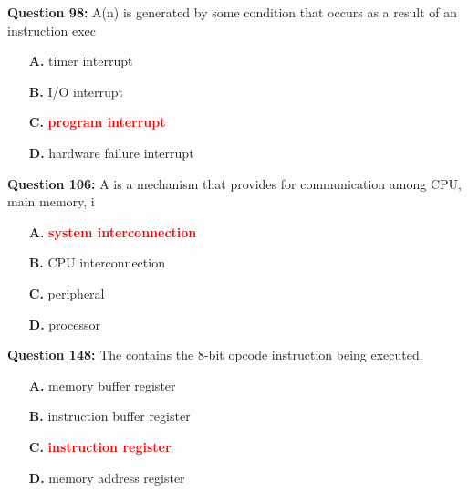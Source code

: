\documentclass[12pt,a4paper]{article}
\begin{document}
\vspace{0.5cm}

\vspace{0.5cm}

\vspace{0.5cm}

\vspace{0.5cm}

\textbf{Question 98:} A(n) \underline{\hspace{1.5cm}} is generated by some condition that occurs as a result of an instruction exec

\begin{itemize}
    \item[\textbf{A.}] timer interrupt
    \item[\textbf{B.}] I/O interrupt
    \item[\textbf{C.}] \textcolor{red}{\textbf{program interrupt}}
    \item[\textbf{D.}] hardware failure interrupt
\end{itemize}

\vspace{0.5cm}

\vspace{0.5cm}

\textbf{Question 106:} A \underline{\hspace{1.5cm}} is a mechanism that provides for communication among CPU, main memory, i

\begin{itemize}
    \item[\textbf{A.}] \textcolor{red}{\textbf{system interconnection}}
    \item[\textbf{B.}] CPU interconnection
    \item[\textbf{C.}] peripheral
    \item[\textbf{D.}] processor
\end{itemize}

\vspace{0.5cm}

\vspace{0.5cm}

\textbf{Question 148:} The \underline{\hspace{1.5cm}} contains the 8-bit opcode instruction being executed.

\begin{itemize}
    \item[\textbf{A.}] memory buffer register
    \item[\textbf{B.}] instruction buffer register
    \item[\textbf{C.}] \textcolor{red}{\textbf{instruction register}}
    \item[\textbf{D.}] memory address register
\end{itemize}
\end{document}
